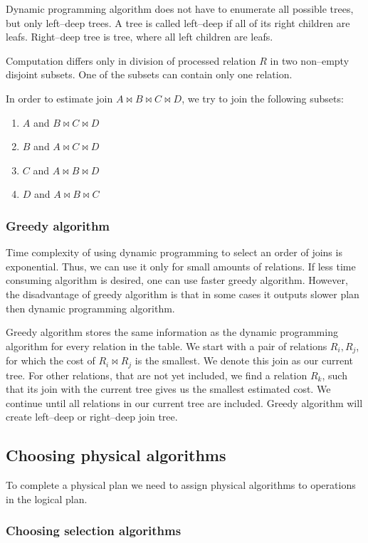  
Dynamic programming algorithm does not have to enumerate all possible trees, but only left--deep trees. A tree is called left--deep if all of its right children are leafs. Right--deep tree is tree, where all left children are leafs.

Computation differs only in division of processed relation $R$ in two non--empty disjoint subsets. One of the subsets can contain only one relation. 

In order to estimate join $A\Join B\Join C\Join D$, we try to join the following subsets:
\begin{enumerate}
\item $A$ and $B\Join C\Join D$
\item $B$ and $A\Join C\Join D$
\item $C$ and $A\Join B\Join D$
\item $D$ and $A\Join B\Join C$
\end{enumerate}

\subsubsection{Greedy algorithm}
\label{greedyalgorithm}
Time complexity of using dynamic programming to select an order of joins is exponential. Thus, we can use it only for small amounts of relations. If less time consuming algorithm is  desired, one can use faster greedy algorithm.
However, the disadvantage of greedy algorithm is that in some cases it outputs slower plan then dynamic programming algorithm.

 Greedy algorithm stores the same information as the dynamic programming algorithm for every relation in the table. We start with a pair of relations $R_i, R_j$, for which the cost of $R_i \Join R_j$ is the smallest. We denote this join as our current tree. For other relations, that are not yet included, we find a relation $R_k$, such that  its join with the current tree gives us the smallest estimated cost. We continue until all relations in our current tree are included. Greedy algorithm will create left--deep or right--deep join tree.


 
\subsection{Choosing physical algorithms}

To complete a physical plan we need to assign physical algorithms to operations in the logical plan.
\subsubsection{Choosing selection algorithms}

